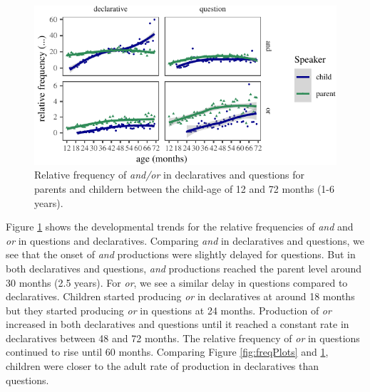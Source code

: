 \documentclass[,man,floatsintext]{apa6}
\begin{document}
\begin{figure}[tb]

{\centering \includegraphics{figs/ageSpeechActPlot-1} 

}

\caption{Relative frequency of \textit{and/or} in declaratives and questions for parents and childern between the child-age of 12 and 72 months (1-6 years).}\label{fig:ageSpeechActPlot}
\end{figure}

Figure \ref{fig:ageSpeechActPlot} shows the developmental trends for the relative frequencies of \emph{and} and \emph{or} in questions and declaratives. Comparing \emph{and} in declaratives and questions, we see that the onset of \emph{and} productions were slightly delayed for questions. But in both declaratives and questions, \emph{and} productions reached the parent level around 30 months (2.5 years). For \emph{or}, we see a similar delay in questions compared to declaratives. Children started producing \emph{or} in declaratives at around 18 months but they started producing \emph{or} in questions at 24 months. Production of \emph{or} increased in both declaratives and questions until it reached a constant rate in declaratives between 48 and 72 months. The relative frequency of \emph{or} in questions continued to rise until 60 months. Comparing Figure \ref{fig:freqPlots} and \ref{fig:ageSpeechActPlot}, children were closer to the adult rate of production in declaratives than questions.
\end{document}
